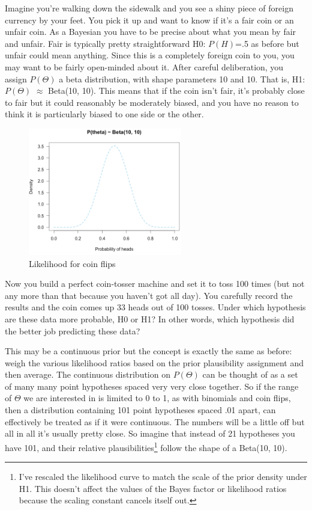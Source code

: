 Imagine you're walking down the sidewalk and you see a shiny piece of foreign currency by your feet. You pick it up and want to know if it's a fair coin or an unfair coin. As a Bayesian you have to be precise about what you mean by fair and unfair. Fair is typically pretty straightforward   H0: $P(H)$=.5 as before   but unfair could mean anything. Since this is a completely foreign coin to you, you may want to be fairly open-minded about it. After careful deliberation, you assign $P(\Theta)$ a beta distribution, with shape parameters 10 and 10. That is, H1: $P(\Theta)$ $\approx$ Beta(10, 10). This means that if the coin isn't fair, it's probably close to fair but it could reasonably be moderately biased, and you have no reason to think it is particularly biased to one side or the other.


\begin{figure}[h]
    \centering
\includegraphics[width=0.6\textwidth]{pic/p05c03-snip16.png}
    \caption{Likelihood for coin flips}
    \label{fig:p05c03-snip16}
\end{figure}


Now you build a perfect coin-tosser machine and set it to toss 100 times (but not any more than that because you haven't got all day). You carefully record the results and the coin comes up 33 heads out of 100 tosses. Under which hypothesis are these data more probable, H0 or H1? In other words, which hypothesis did the better job predicting these data?

This may be a continuous prior but the concept is exactly the same as before: weigh the various likelihood ratios based on the prior plausibility assignment and then average. The continuous distribution on $P(\Theta)$ can be thought of as a set of many many point hypotheses spaced very very close together. So if the range of $\Theta$ we are interested in is limited to 0 to 1, as with binomials and coin flips, then a distribution containing 101 point hypotheses spaced .01 apart, can effectively be treated as if it were continuous. The numbers will be a little off but all in all it's usually pretty close. So imagine that instead of 21 hypotheses you have 101, and their relative plausibilities\footnote{I've rescaled the likelihood curve to match the scale of the prior density under H1. This doesn't affect the values of the Bayes factor or likelihood ratios because the scaling constant cancels itself out.} follow the shape of a Beta(10, 10). 


